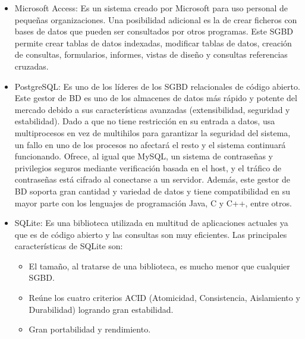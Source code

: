 \begin{itemize}
    \item Microsoft Access: Es un sistema creado por Microsoft para uso personal de pequeñas organizaciones. Una posibilidad adicional es la de crear ficheros con bases de datos que pueden ser consultados por otros programas. Este SGBD permite crear tablas de datos indexadas, modificar tablas de datos, creación de consultas, formularios, informes, vistas de diseño y consultas referencias cruzadas.
    
    \item PostgreSQL: Es uno de los líderes de los SGBD relacionales de código abierto. Este gestor de BD es uno de los almacenes de datos más rápido y potente del mercado debido a sus características avanzadas (extensibilidad, seguridad y estabilidad). Dado a que no tiene restricción en su entrada a datos, usa multiprocesos en vez de multihilos para garantizar la seguridad del sistema, un fallo en uno de los procesos no afectará el resto y el sistema continuará funcionando. Ofrece, al igual que MySQL, un sistema
    de contraseñas y privilegios seguros mediante verificación basada en el host, y el tráfico de contraseñas está cifrado al conectarse a un servidor. Además, este gestor de BD soporta gran cantidad y variedad de datos y tiene compatibilidad en su mayor parte con los lenguajes de programación Java, C y C++, entre otros.

    \item SQLite: Es una biblioteca utilizada en multitud de aplicaciones actuales ya que es de código abierto y las consultas son muy eficientes. Las principales características de SQLite son:
    \begin{itemize}
        \item El tamaño, al tratarse de una biblioteca, es mucho menor que cualquier SGBD.
        \item Reúne los cuatro criterios ACID (Atomicidad, Consistencia, Aislamiento y Durabilidad) logrando gran estabilidad.
        \item Gran portabilidad y rendimiento.
    \end{itemize}
\end{itemize}